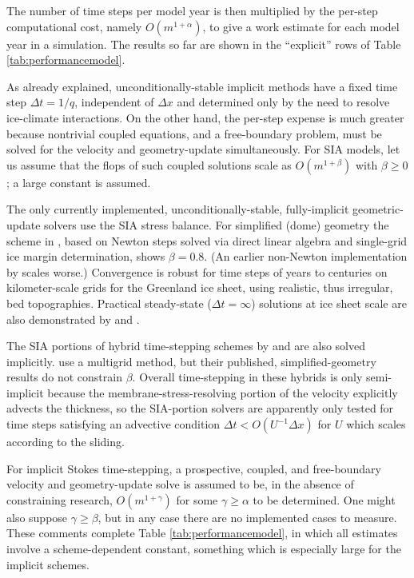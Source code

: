 \documentclass[review,letterpaper]{igs}
\begin{document}
The number of time steps per model year is then multiplied by the per-step computational cost, namely $O(m^{1+\alpha})$, to give a work estimate for each model year in a simulation.  The results so far are shown in the ``explicit'' rows of Table \ref{tab:performancemodel}.

As already explained, unconditionally-stable implicit methods have a fixed time step $\Delta t = 1/q$, independent of $\Delta x$ and determined only by the need to resolve ice-climate interactions.  On the other hand, the per-step expense is much greater because nontrivial coupled equations, and a free-boundary problem, must be solved for the velocity and geometry-update simultaneously.  For SIA models, let us assume that the flops of such coupled solutions scale as $O(m^{1+\beta})$ with $\beta \ge 0$; a large constant is assumed.


The only currently implemented, unconditionally-stable, fully-implicit geometric-update solvers use the SIA stress balance.  For simplified (dome) geometry the scheme in \cite{Bueler2016}, based on Newton steps solved via direct linear algebra and single-grid ice margin determination, shows $\beta=0.8$.  (An earlier non-Newton implementation by \cite{JouvetBueler2012} scales worse.)  Convergence is robust for time steps of years to centuries on kilometer-scale grids for the Greenland ice sheet, using realistic, thus irregular, bed topographies.  Practical steady-state ($\Delta t=\infty$) solutions at ice sheet scale are also demonstrated by \cite{JouvetBueler2012} and \cite{Bueler2016}.

The SIA portions of hybrid time-stepping schemes by \cite{JouvetGraeser2013} and \cite{BrinkerhoffJohnson2015} are also solved implicitly.  \cite{JouvetGraeser2013} use a multigrid method, but their published, simplified-geometry results do not constrain $\beta$.  Overall time-stepping in these hybrids is only semi-implicit because the membrane-stress-resolving portion of the velocity explicitly advects the thickness, so the SIA-portion solvers are apparently only tested for time steps satisfying an advective condition $\Delta t < O(U^{-1}\Delta x)$ for $U$ which scales according to the sliding.

For implicit Stokes time-stepping, a prospective, coupled, and free-boundary velocity and geometry-update solve is assumed to be, in the absence of constraining research, $O(m^{1+\gamma})$ for some $\gamma \ge \alpha$ to be determined.  One might also suppose $\gamma\ge \beta$, but in any case there are no implemented cases to measure.  These comments complete Table \ref{tab:performancemodel}, in which all estimates involve a scheme-dependent constant, something which is especially large for the implicit schemes.
\end{document}
